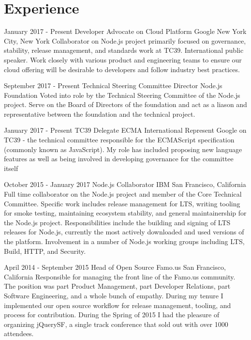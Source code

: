 \documentclass[10pt,a4paper,sans]{moderncv}   %
\begin{document}
\makecvtitle

\section{Experience}

\cventry
  {January 2017 - Present}
  {Developer Advocate on Cloud Platform}
  {Google}
  {New York City, New York}{}
  {Collaborator on Node.js project primarily focused on governance, stability, release management, and standards work at TC39. International public speaker. Work closely with various product and engineering teams to ensure our cloud offering will be desirable to developers and follow industry best practices. }

\cventry
  {September 2017 - Present}
  {Technical Steering Committee Director}
  {Node.js Foundation}
  {}{}
  {Voted into role by the Technical Steering Committee of the Node.js project. Serve on the Board of Directors of the foundation and act as a liason and representative between the foundation and the technical project.}

\cventry
  {January 2017 - Present}
  {TC39 Delegate}
  {ECMA International}
  {}{}
  {Represent Google on TC39 - the technical committee responsible for the ECMAScript specification (commonly known as JavaScript). My role has included proposing new language features as well as being involved in developing governance for the committee itself}

\cventry
  {October 2015 - January 2017}
  {Node.js Collaborator}
  {IBM}
  {San Francisco, California}{}
  {Full time collaborator on the Node.js project and member of the Core Technical Committee. Specific work includes release management for LTS, writing tooling for smoke testing, maintaining ecosystem stability, and general maintainership for the Node.js project.  Responsibilities include the building and signing of LTS releases for Node.js, currently the most actively downloaded and used versions of the platform. Involvement in a number of Node.js working groups including LTS, Build, HTTP, and Security.  }

\cventry
  {April 2014 - September 2015}
  {Head of Open Source}
  {Famo.us}
  {San Francisco, California}{}
  {Responsible for managing the front line of the Famo.us community. The position was part Product Management, part Developer Relations, part Software Engineering, and a whole bunch of empathy.  During my tenure I implemented our open source workflow for release management, tooling, and process for contribution. During the Spring of 2015 I had the pleasure of organizing jQuerySF, a single track conference that sold out with over 1000 attendees.}
\end{document}
